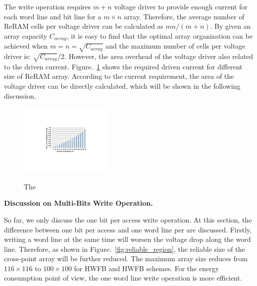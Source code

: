 The write operation requires $m+n$ voltage driver to provide enough current for each word line and bit line for a $m{\times}n$ array.
Therefore, the average number of ReRAM cells per voltage driver can be
calculated as $mn/(m+n)$. By given an array capacity $C_{array}$, it is
easy to find that the optimal array organization can be achieved when
$m=n=\sqrt{C_{array}}$ and the maximum number of cells per voltage driver
is: $\sqrt{C_{array}}/2$. However, the area overhead of the voltage driver also related to the driven current. Figure.~\ref{fig:w_current} shows the required driven current for different size of ReRAM array. According to the current requirement, the area of the voltage driver can be directly calculated, which will be shown in the following discussion.

\begin{figure}%
\centering
  \includegraphics[width=0.4\textwidth]{./figures/w_current2.pdf}\\
  \caption{The }\label{fig:w_current}
\end{figure}

\vspace{10pt} \textbf{Discussion on Multi-Bits Write Operation.} \vspace{8pt}

So far, we only discuss the one bit per access write operation. At this section, the difference between one bit per access and one word line per are discussed. Firstly, writing a word line at the same time will worsen the voltage drop along the word line. Therefore, as shown in Figure.~\ref{fig:reliable_region}, the reliable size of the cross-point array will be further reduced. The maximum array size reduces from $116{\times}116$ to $100{\times}100$ for HWFB and HWFB schemes. For the energy consumption point of view, the one word line write operation is more efficient.


